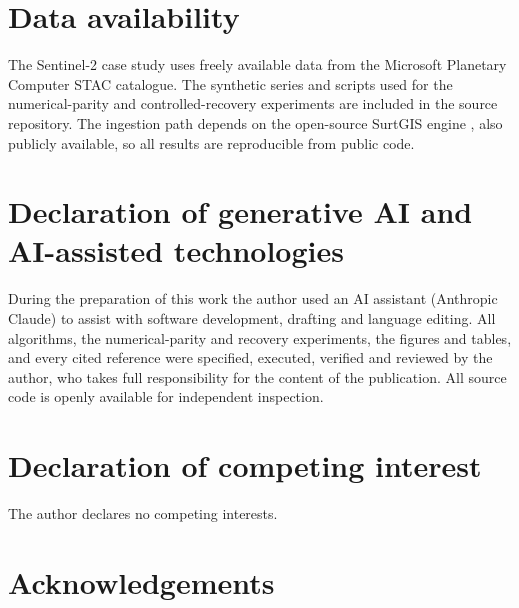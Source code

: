 \documentclass[review]{elsarticle}
\begin{document}
\section*{Data availability}
The Sentinel-2 case study uses freely available data from the Microsoft
Planetary Computer STAC catalogue. The synthetic series and scripts used for the
numerical-parity and controlled-recovery experiments are included in the source
repository. The ingestion path depends on the open-source SurtGIS engine
\citep{surtgis}, also publicly available, so all results are reproducible from
public code.

\section*{Declaration of generative AI and AI-assisted technologies}
During the preparation of this work the author used an AI assistant (Anthropic
Claude) to assist with software development, drafting and language editing. All
algorithms, the numerical-parity and recovery experiments, the figures and
tables, and every cited reference were specified, executed, verified and
reviewed by the author, who takes full responsibility for the content of the
publication. All source code is openly available for independent inspection.

\section*{Declaration of competing interest}
The author declares no competing interests.

\section*{Acknowledgements}


\end{document}
